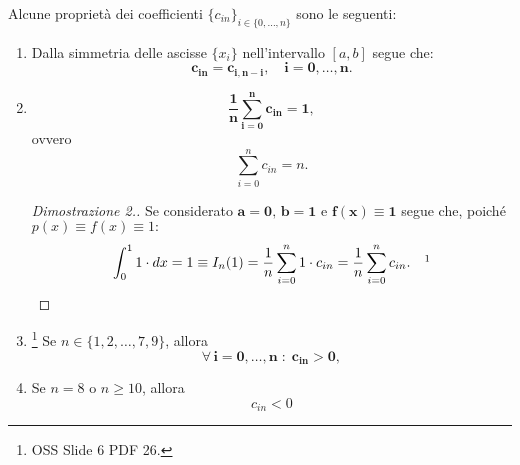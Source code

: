 \begin{property}[Proprietà di $c_{in}$]
	Alcune proprietà dei coefficienti $\{c_{in}\}_{i\in\{0, \hdots,n\}}$ sono le seguenti:
	\begin{enumerate}
	    \item \footnotemark Dalla simmetria delle ascisse $\{x_i\}$ nell'intervallo $[a,b]$ segue che:
	    \begin{equation}\label{eq:coefficienti_simmetrici_formula_newton_cotes}
	        \boldsymbol{c_{in}=c_{i,n-i},\quad i=0,\hdots,n.}
	    \end{equation}
	    \item \footnotemark \begin{equation}\label{eq:coefficienti_formula_newton_cotes_uguale_1}
	        \boldsymbol{\frac{1}{n}\sum_{i=0}^{n}c_{in}=1},
	    \end{equation}
	    ovvero
	    \begin{equation*}
	    	\sum_{i=0}^{n}c_{in} = n.
	    \end{equation*}
	    \begin{proof}[Dimostrazione 2.]
	        Se considerato $\boldsymbol{a=0},\, \boldsymbol{b=1}$ e $\boldsymbol{f(x)\equiv1}$ segue che, poiché $p(x)\equiv f(x)\equiv 1:$
	        \begin{equation*}
	            \int_0^1 1\cdot dx=1\equiv I_n(1)=\frac{1}{n}\sum_{i=0}^n1\cdot 	c_{in}=\frac{1}{n}\sum_{i=0}^nc_{in}.\quad\footnotemark
	        \end{equation*}
	    \end{proof}
	    \item \footnote{OSS Slide 6 PDF 26.} Se $n\in\{1,2,\hdots, 7, 9\}$, allora
	    \begin{equation}\label{eq:coefficiente_formula_N-C_GT0}
	    	\boldsymbol{\forall\, i=0,\hdots, n\; :\; c_{in} > 0},
	    \end{equation}
	    \item Se $n=8$ o $n\geq 10$, allora 
	    \begin{equation}\label{eq:coefficiente_formula_N-C_LT0}
	    	c_{in} < 0
	    \end{equation}
	\end{enumerate}
\end{property}

